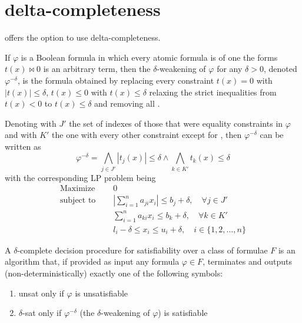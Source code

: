 \documentclass[runningheads]{llncs}
\begin{document}
\section{delta-completeness}
\label{sec:delta-completeness}

\dlinear offers the option to use delta-completeness.

\begin{definition}
    If $\varphi$ is a Boolean formula in which every atomic formula is of one the forms $t(x) \bowtie 0$ is an arbitrary term, then the $\delta$-weakening of $\varphi$ for any $\delta > 0$, denoted $\varphi^{-\delta}$, is the formula obtained by replacing every constraint $t(x) = 0$ with $|t(x)| \le \delta$, $t(x) \le 0$ with $t(x) \le \delta$ relaxing the strict inequalities from $t(x) < 0$ to $t(x) \le \delta$ and removing all \nqcs.
\end{definition}
Denoting with $J'$ the set of indexes of those that were equality constraints in $\varphi$ and with $K'$ the one with every other constraint except for \nqcs, then $\varphi^{-\delta}$ can be written as
\begin{equation*}
    \varphi^{-\delta} = \bigwedge_{j \in J'} |t_j(x)| \le \delta \wedge \bigwedge_{k \in K'} t_k(x) \le \delta
\end{equation*}
with the corresponding LP problem being
\begin{equation}
    \label{eq:delta-lp}
    \begin{split}
        \text{Maximize }   \quad & 0                                                                                \\
        \text{subject to } \quad & \left|\sum_{i=1}^{n} a_{ji}x_{i}\right| \le b_j + \delta, \quad \forall j \in J' \\
        \quad                    & \sum_{i=1}^{n} a_{ki}x_{i} \le b_k + \delta, \quad \forall k \in K'              \\
        \quad                    & l_i - \delta \le x_i \le u_i + \delta,  \quad i \in \{1, 2, \ldots, n\}
    \end{split}
\end{equation}
\begin{definition}
    A $\delta$-complete decision procedure for satisfiability over a class of formulae $F$ is an algorithm that, if provided as input any formula $\varphi \in F$, terminates and outputs (non-deterministically) exactly one of the following symbols:
    \begin{enumerate}
        \item unsat only if $\varphi$ is unsatisfiable
        \item $\delta$-sat only if $\varphi^{-\delta}$ (the $\delta$-weakening of $\varphi$) is satisfiable
    \end{enumerate}
\end{definition}
\end{document}
